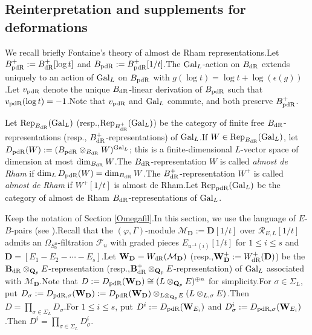 \documentclass[10pt]{article}
\newcommand{\pdr}{{\rm pdR}}
\newcommand{\ccyc}{{\epsilon}}
\newcommand{\gal}{{\rm Gal}}
\newcommand{\dr}{{\rm dR}}
\newcommand{\Dpik}{{\mathbf{D}}}
\newcommand{\bB}{{\mathbf{B}}}
\newcommand{\bQ}{{\mathbf{Q}}}
\newcommand{\bW}{{\mathbf{W}}}
\newcommand{\cR}{\mathcal R}
\newcommand{\cM}{\mathcal M}
\newcommand{\cF}{\mathcal F}
\begin{document}
\subsection{Reinterpretation and supplements for deformations}\label{reinterfor33}



We recall briefly Fontaine's theory of almost de Rham representations.\;Let $B_{\pdr}^+:=B_{\dr}^+[\log t]$ and $B_{\pdr}:=B_{\pdr}^+[1/t]$.\;The $\gal_L$-action on $B_{\dr}$ extends uniquely to an action of $\gal_L$ on $B_{\pdr}$ with $g(\log t)=\log t+\log(\ccyc(g))$.\;Let $v_{\pdr}$ denote the unique $B_{\dr}$-linear derivation of $B_{\pdr}$ such that $v_{\pdr}(\log t)=-1$.\;Note that $v_{\pdr}$ and $\gal_L$ commute, and both preserve $B_{\pdr}^+$.\;


Let $\mathrm{Rep}_{B_{\dr}}(\gal_L)$ (resp.,\;$\mathrm{Rep}_{B^+_{\dr}}(\gal_L)$) be the category of finite free $B_{\dr}$-representations (resp., $B^+_{\dr}$-representations) of $\gal_L$.\;If $W\in \mathrm{Rep}_{B_{\dr}}(\gal_L)$, let $D_{\pdr}(W):=(B_{\pdr}\otimes_{B_{\dr}}W)^{\gal_L}$; this is a finite-dimensional $L$-vector space of dimension at most $\dim_{B_{\dr}}W$.\;The $B_{\dr}$-representation $W$ is called \textit{almost de Rham} if $\dim_LD_{\pdr}(W)=\dim_{B_{\dr}}W$.\;The $B^+_{\dr}$-representation $W^+$ is called \textit{almost de Rham} if $W^+[1/t]$ is almost de Rham.\;Let $\mathrm{Rep}_{\pdr}(\gal_L)$ be the category of almost de Rham $B_{\dr}$-representations of $\gal_L$.\;

Keep the notation of Section \ref{Omegafil}.\;In this section, we use the language of $E$-$B$-pairs (see \cite{nakamura2009classification}).\;Recall that the $(\varphi,\Gamma)$-module $\cM_\Dpik:=\Dpik[1/t]$ over $\cR_{E,L}[1/t]$ admits an $\Omega_{S_0^u}$-filtration $\cF_u$ with graded pieces $E_{u^{-1}(i)}[1/t]$ for $1\leq i\leq s$ and $\Dpik=[E_{1}-E_{2}-\cdots-E_{s}]$.\;Let $\bW_{\Dpik}=W_{\dr}(\cM_\Dpik)$ (resp.,\;$\bW^+_{\Dpik}:=W_{\dr}^+(\Dpik)$) be the $\bB_\dr\otimes_{\bQ_p}E$-representation (resp.,\;$\bB_\dr^+\otimes_{\bQ_p}E$-representation) of $\gal_L$ associated with $\cM_\Dpik$.\;Note that $D:=D_{\pdr}(\bW_\Dpik)\cong (L\otimes_{\bQ_p}E)^{\oplus n}$ for simplicity.\;For $\sigma\in \Sigma_L$, put $D_{\sigma}:=D_{\pdr,\sigma}(\bW_\Dpik):=D_{\pdr}(\bW_\Dpik)\otimes_{L\otimes_{\bQ_p}E}(L\otimes_{L,\sigma}E)$.\;Then $D=\prod_{\sigma\in \Sigma_L}D_{\sigma}$.\;For $1\leq i\leq s$, put $D^i:=D_{\pdr}(\bW_{E_i})$ and $D^i_{\sigma}:=D_{\pdr,\sigma}(\bW_{E_i})$.\;Then $D^i=\prod_{\sigma\in \Sigma_L}D^i_{\sigma}$.\;
\end{document}
